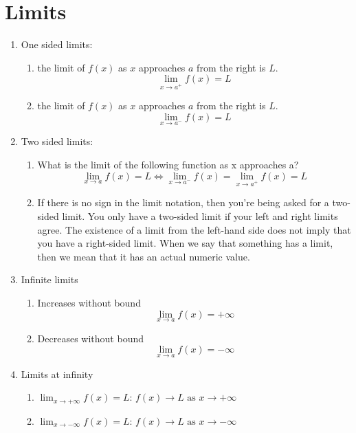
\section{Limits}

\begin{myframe}[arc=10pt,auto outer arc]

\begin{enumerate}
\item One sided limits:
	\begin{enumerate}
		\item the limit of $f(x)$ as $x$ approaches $a$ from the right is $L$.
		\[
			\lim_{x\rightarrow a^+} f\left(x\right) = L
		\]
		\item the limit of $f(x)$ as $x$ approaches $a$ from the right is $L$.
		\[
			\lim_{x\rightarrow a^-} f\left(x\right) = L
		\]		
	\end{enumerate}
\item Two sided limits:

    \begin{enumerate}
    \item What is the limit of the following function as x approaches a?
    \[
    	\lim_{x\rightarrow a} f\left(x\right) = L \iff \lim_{x\rightarrow a^-} f\left(x\right) = \lim_{x\rightarrow a^+} f\left(x\right) = L
    \]
    
    \item If there is no sign in the limit notation, then you’re being asked for a two-sided limit. You only have a two-sided limit if your left and right limits agree. The existence of a limit from the left-hand side does not imply that you have a right-sided limit.
    When we say that something has a limit, then we mean that it has an actual numeric value.
    \end{enumerate}
    
\item Infinite limits
	\begin{enumerate}
		\item Increases without bound
		\[ \lim_{x \rightarrow a} f(x) = +\infty \]
		\item Decreases without bound
		\[ \lim_{x \rightarrow a} f(x) = -\infty \]
	\end{enumerate}

\item Limits at infinity
	\begin{enumerate}
	\item $\displaystyle \lim_{x \rightarrow +\infty} f(x) = L$: $\displaystyle f(x) \rightarrow L \textrm{ as } x \rightarrow +\infty$
	\item $\displaystyle \lim_{x \rightarrow -\infty} f(x) = L$: $\displaystyle f(x) \rightarrow L \textrm{ as } x \rightarrow -\infty$
	\end{enumerate}


\end{enumerate}
\end{myframe}
